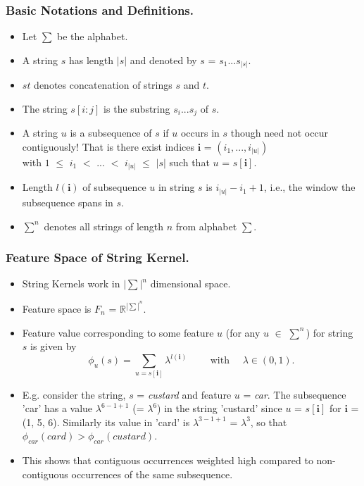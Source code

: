 \documentclass[10pt]{beamer}
\begin{document}
\begin{frame}
	\frametitle{Basic Notations and Definitions.}
	\begin{itemize}
		\item Let $\sum$ be the alphabet.
		\item A string $s$ has length $|s|$ and denoted by $s$ = $s_1...s_{|s|}$.
		\item $st$ denotes concatenation of strings $s$ and $t$.
		\item The string $s[i:j]$ is the substring $s_i . . . s_j$ of $s$.
		\item A string $u$ is a subsequence of $s$ if $u$ occurs in $s$ though need not occur contiguously! That is there
					exist indices $\textbf{i}$ = $(i_1,...,i_{|u|})$ \\ with $1$ $\leq$ $i_1$ $<$ ... $<$ $i_{|u|}$ $\leq$ $|s|$
					such that $u$ = $s[\textbf{i}]$.
		\item Length $l(\textbf{i})$ of subsequence $u$ in string $s$ is $i_{|u|} - i_1 + 1$, i.e., the window the subsequence 
					spans in $s$.
		\item $\sum^n$ denotes all strings of length $n$ from alphabet $\sum$.
	\end{itemize}
\end{frame}

\begin{frame}
	\frametitle{Feature Space of String Kernel.}
	\begin{itemize}
		\item String Kernels work in $|\sum|^n$ dimensional space.
		\item Feature space is $F_n$ = $\mathbb{R}^{|\sum|^n}$.
		\item Feature value corresponding to some feature $u$ (for any $u$ $\in$ $\sum^n$) for string $s$ is given by\\
		\begin{equation*}
				\phi_u(s) = \sum_{u=s[\textbf{i}]} \lambda^{l(\textbf{i})} \qquad \textrm{ with } \quad \lambda \in (0, 1). 
		\end{equation*}
		\item E.g. consider the string, $s$ = \textit{custard} and feature $u$ = \textit{car}. The subsequence 'car' has a 
				value $\lambda^{6-1+1}$ (= $\lambda^6$) in the string 'custard' since $u$ = $s[\textbf{i}]$ for $\textbf{i}$ = (1, 5, 6).
				Similarly its value in 'card' is $\lambda^{3-1+1}$ = $\lambda^3$, so that $\phi_{car}(card) > \phi_{car}(custard)$. 
		\item This shows that contiguous occurrences weighted high compared to non-contiguous occurrences of the same subsequence.
	\end{itemize}
\end{frame}
\end{document}
